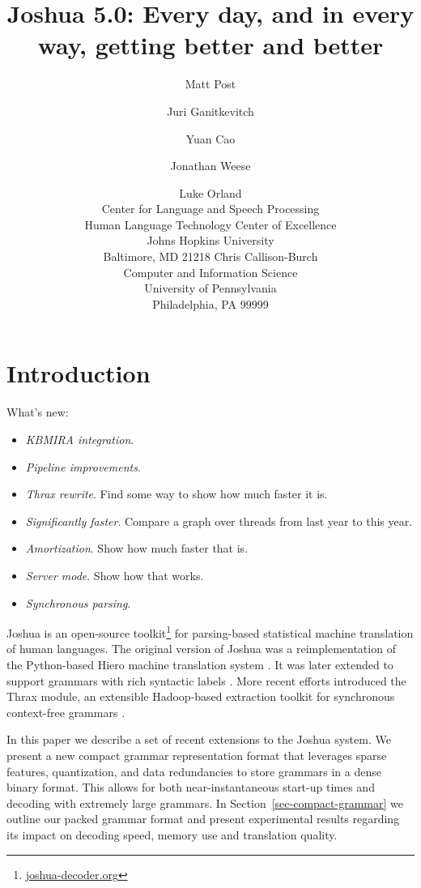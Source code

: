 \documentclass[11pt]{article}
\title{Joshua 5.0: Every day, and in every way, getting better and better}
\author{Matt Post\hltcoe \and Juri Ganitkevitch\clsp \and Yuan Cao\clsp \and Jonathan Weese\clsp 
  \and Luke Orland\hltcoe \\
  \clsp Center for Language and Speech Processing \\
  \hltcoe Human Language Technology Center of Excellence \\
  Johns Hopkins University \\
  Baltimore, MD 21218
  \AND  Chris Callison-Burch \\
  Computer and Information Science \\
  University of Pennsylvania \\
  Philadelphia, PA 99999
}
\date{}
\begin{document}
\maketitle

\begin{abstract}

\end{abstract}

\section{Introduction}
\label{sec-intro}

What's new:

\begin{itemize}
  \item \emph{KBMIRA integration}.
  \item \emph{Pipeline improvements}.
  \item \emph{Thrax rewrite}. Find some way to show how much faster it is.
  \item \emph{Significantly faster}. Compare a graph over threads from last year to this year.
  \item \emph{Amortization}. Show how much faster that is.
  \item \emph{Server mode}. Show how that works.
  \item \emph{Synchronous parsing}. 
\end{itemize}

Joshua is an open-source toolkit\footnote{\url{joshua-decoder.org}}
for parsing-based statistical machine translation of human
languages. The original version of Joshua \cite{Joshua-WMT} was a
reimplementation of the Python-based Hiero machine translation system
\cite{Chiang2007}. It was later extended to support grammars with rich
syntactic labels \cite{li2010joshua}. More recent efforts introduced
the Thrax module, an extensible Hadoop-based extraction toolkit for
synchronous context-free grammars \cite{Joshua-3.0}.

In this paper we describe a set of recent extensions to the Joshua
system. We present a new compact grammar representation format that
leverages sparse features, quantization, and data redundancies to
store grammars in a dense binary format. This allows for both
near-instantaneous start-up times and decoding with extremely large
grammars. In Section~\ref{sec-compact-grammar} we outline our packed
grammar format and present experimental results regarding its impact
on decoding speed, memory use and translation quality.
\end{document}
